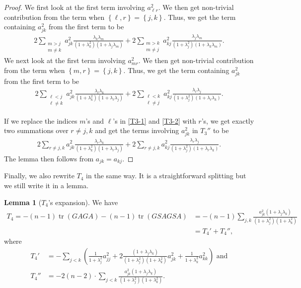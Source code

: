 \documentclass[11pt]{amsart}
\numberwithin{equation}{section}
\theoremstyle{definition}
\theoremstyle{definition}
\newtheorem{lemma}[equation]{Lemma}
\newcommand{\set}[1]{\left\{#1\right\}}
\newcommand{\pr}[1]{\left(#1\right)}
\begin{document}
\begin{proof}
	We first look at the first term involving $a_{\ell r}^2.$
	We then get non-trivial contribution from the term when $\set{\ell,r}=\set{j,k}.$
	Thus, we get the term containing $a_{jk}^2$ from the first term to be
	\begin{align}\label{T3-1}
	2\sum_{\substack{m>j\\m\neq k}}
	a_{jk}^2
	\frac{\lambda_k \lambda_m}{(1+\lambda_k^2)(1+\lambda_j\lambda_m)}
	+ 2\sum_{\substack{m>k\\m\neq j}}
	a_{kj}^2
	\frac{\lambda_j \lambda_m}{(1+\lambda_j^2)(1+\lambda_k\lambda_m)}.
	\end{align}
	We next look at the first term involving $a_{m r}^2.$
	We then get non-trivial contribution from the term when $\set{m,r}=\set{j,k}.$
	Thus, we get the term containing $a_{jk}^2$ from the first term to be
	\begin{align}\label{T3-2}
	2\sum_{\substack{\ell<j\\\ell\neq k}}
	a_{jk}^2
	\frac{\lambda_\ell\lambda_k}
	{(1+\lambda_k^2)(1+\lambda_\ell\lambda_j)}
	+ 2\sum_{\substack{\ell<k\\\ell\neq j}}
	a_{kj}^2
	\frac{\lambda_\ell\lambda_j}
	{(1+\lambda_j^2)(1+\lambda_\ell\lambda_k)}.
	\end{align}
	
	If we replace the indices $m$'s and $\ell$'s in \eqref{T3-1} and \eqref{T3-2} with $r$'s, we get exactly two summations over $r\neq j,k$ and get the terms involving $a_{jk}^2$ in $T_3''$ to be 
	\begin{align*}
	2\sum_{r\neq j,k}
	a_{jk}^2
	\frac{\lambda_r\lambda_k}{(1+\lambda_k^2)(1+\lambda_r\lambda_j)}
	+ 2\sum_{r\neq j,k}
	a_{kj}^2
	\frac{\lambda_r\lambda_j}{(1+\lambda_j^2)(1+\lambda_r\lambda_k)}.
	\end{align*}
	The lemma then follows from $a_{jk}=a_{kj}.$
\end{proof}

Finally, we also rewrite $T_4$ in the same way.
It is a straightforward splitting but we still write it in a lemma.


\begin{lemma}[$T_4$'s expansion]
	\label{lem:T4}
	We have
	\[\begin{split}T_4
    =-(n-1) \operatorname{tr}(G A G A) -(n-1) \operatorname{tr}(G S A G S A)
    &= -(n-1)\sum_{j,k}
	\frac{a_{jk}^2\pr{1+\lambda_j\lambda_k}}{(1+\lambda_j^2)(1+\lambda_k^2)}\\
	&=T_4'+T_4'',
	\end{split}\]
	where 
	\begin{align*}
	T_4'&=- \sum_{j<k}\pr{
		\frac{1}{1+\lambda_j^2} a_{jj}^2
		+2 \frac{\pr{1+\lambda_j\lambda_k}}{(1+\lambda_j^2)(1+\lambda_k^2)} a_{jk}^2
		+ \frac{1}{1+\lambda_k^2} a_{kk}^2
	}\text{ and}\\
	T_4''&=- 2(n-2)\cdot \sum_{j<k} 
	\frac{a_{jk}^2\pr{1+\lambda_j\lambda_k}}{(1+\lambda_j^2)(1+\lambda_k^2)}.
	\end{align*}
	
\end{lemma}
\end{document}
